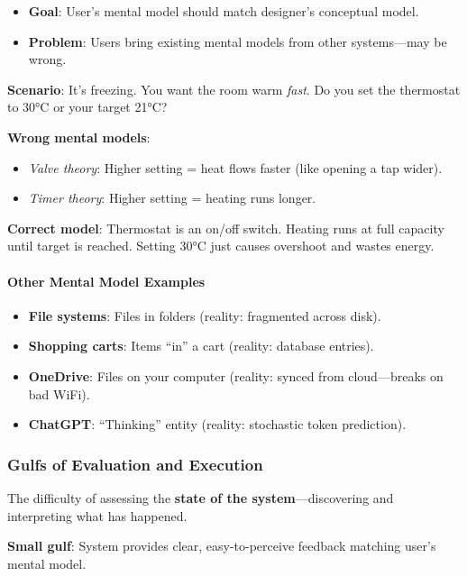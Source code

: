 \begin{itemize}
  \item \textbf{Goal}: User's mental model should match designer's conceptual model.
  \item \textbf{Problem}: Users bring existing mental models from other systems---may be wrong.
\end{itemize}

\begin{exbox}
\textbf{Scenario}: It's freezing. You want the room warm \textit{fast}. Do you set the thermostat to 30°C or your target 21°C?

\textbf{Wrong mental models}:
\begin{itemize}
  \item \textit{Valve theory}: Higher setting = heat flows faster (like opening a tap wider).
  \item \textit{Timer theory}: Higher setting = heating runs longer.
\end{itemize}

\textbf{Correct model}: Thermostat is an on/off switch. Heating runs at full capacity until target is reached. Setting 30°C just causes overshoot and wastes energy.
\end{exbox}

\paragraph*{Other Mental Model Examples}
\begin{itemize}
  \item \textbf{File systems}: Files in folders (reality: fragmented across disk).
  \item \textbf{Shopping carts}: Items ``in'' a cart (reality: database entries).
  \item \textbf{OneDrive}: Files on your computer (reality: synced from cloud---breaks on bad WiFi).
  \item \textbf{ChatGPT}: ``Thinking'' entity (reality: stochastic token prediction).
\end{itemize}

\subsubsection*{Gulfs of Evaluation and Execution}

\begin{defbox}
The difficulty of assessing the \textbf{state of the system}---discovering and interpreting what has happened.

\textbf{Small gulf}: System provides clear, easy-to-perceive feedback matching user's mental model.
\end{defbox}

